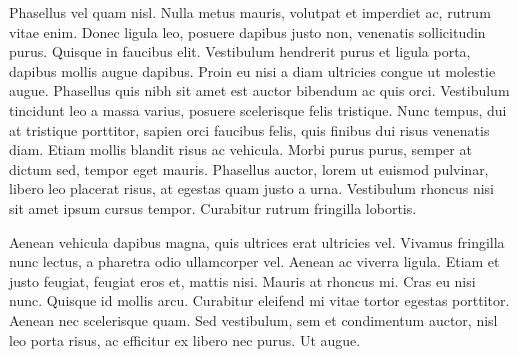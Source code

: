 Phasellus vel quam nisl. Nulla metus mauris, volutpat et imperdiet ac, rutrum vitae enim. Donec ligula leo, posuere dapibus justo non, venenatis sollicitudin purus. Quisque in faucibus elit. Vestibulum hendrerit purus et ligula porta, dapibus mollis augue dapibus. Proin eu nisi a diam ultricies congue ut molestie augue. Phasellus quis nibh sit amet est auctor bibendum ac quis orci. Vestibulum tincidunt leo a massa varius, posuere scelerisque felis tristique. Nunc tempus, dui at tristique porttitor, sapien orci faucibus felis, quis finibus dui risus venenatis diam. Etiam mollis blandit risus ac vehicula. Morbi purus purus, semper at dictum sed, tempor eget mauris. Phasellus auctor, lorem ut euismod pulvinar, libero leo placerat risus, at egestas quam justo a urna. Vestibulum rhoncus nisi sit amet ipsum cursus tempor. Curabitur rutrum fringilla lobortis.

Aenean vehicula dapibus magna, quis ultrices erat ultricies vel. Vivamus fringilla nunc lectus, a pharetra odio ullamcorper vel. Aenean ac viverra ligula. Etiam et justo feugiat, feugiat eros et, mattis nisi. Mauris at rhoncus mi. Cras eu nisi nunc. Quisque id mollis arcu. Curabitur eleifend mi vitae tortor egestas porttitor. Aenean nec scelerisque quam. Sed vestibulum, sem et condimentum auctor, nisl leo porta risus, ac efficitur ex libero nec purus. Ut augue.
